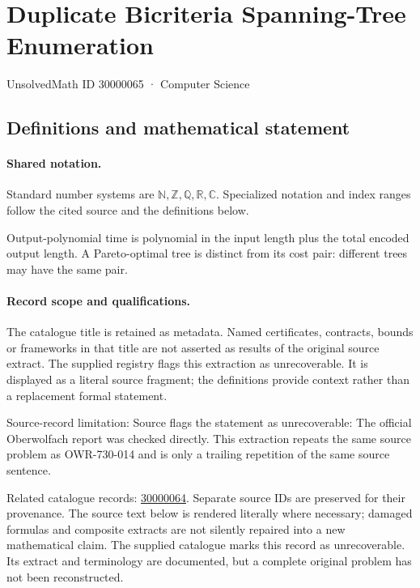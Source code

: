\documentclass[11pt]{article}
\begin{document}
\setcounter{section}{30000064}
\section{Duplicate Bicriteria Spanning-Tree Enumeration}\label{30000065}
{\small\sffamily UnsolvedMath ID 30000065 · Computer Science}
\subsection{Definitions and mathematical statement}

\paragraph{Shared notation.}Standard number systems are $\mathbb N,\mathbb Z,\mathbb Q,\mathbb R,\mathbb C$. Specialized notation and index ranges follow the cited source and the definitions below.


Output-polynomial time is polynomial in the input length plus the total encoded output length. A Pareto-optimal tree is distinct from its cost pair: different trees may have the same pair.
\paragraph{Record scope and qualifications.}
The catalogue title is retained as metadata. Named certificates, contracts, bounds or frameworks in that title are not asserted as results of the original source extract.
The supplied registry flags this extraction as unrecoverable. It is displayed as a literal source fragment; the definitions provide context rather than a replacement formal statement.

Source-record limitation: Source flags the statement as unrecoverable: The official Oberwolfach report was checked directly. This extraction repeats the same source problem as OWR-730-014 and is only a trailing repetition of the same source sentence.

Related catalogue records: \href{https://mehmetmars7.github.io/Erdosproblems-llm-hunter/problem.html?type=open_problems&id=30000064}{30000064}. Separate source IDs are preserved for their provenance.
The source text below is rendered literally where necessary; damaged formulas and composite extracts are not silently repaired into a new mathematical claim.
The supplied catalogue marks this record as unrecoverable. Its extract and terminology are documented, but a complete original problem has not been reconstructed.
\end{document}
